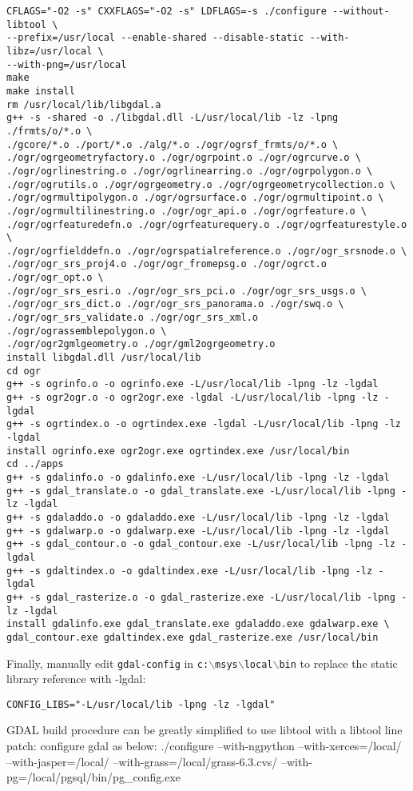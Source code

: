 \begin{verbatim}
CFLAGS="-O2 -s" CXXFLAGS="-O2 -s" LDFLAGS=-s ./configure --without-libtool \
--prefix=/usr/local --enable-shared --disable-static --with-libz=/usr/local \
--with-png=/usr/local
make
make install
rm /usr/local/lib/libgdal.a
g++ -s -shared -o ./libgdal.dll -L/usr/local/lib -lz -lpng ./frmts/o/*.o \
./gcore/*.o ./port/*.o ./alg/*.o ./ogr/ogrsf_frmts/o/*.o \
./ogr/ogrgeometryfactory.o ./ogr/ogrpoint.o ./ogr/ogrcurve.o \
./ogr/ogrlinestring.o ./ogr/ogrlinearring.o ./ogr/ogrpolygon.o \
./ogr/ogrutils.o ./ogr/ogrgeometry.o ./ogr/ogrgeometrycollection.o \
./ogr/ogrmultipolygon.o ./ogr/ogrsurface.o ./ogr/ogrmultipoint.o \
./ogr/ogrmultilinestring.o ./ogr/ogr_api.o ./ogr/ogrfeature.o \
./ogr/ogrfeaturedefn.o ./ogr/ogrfeaturequery.o ./ogr/ogrfeaturestyle.o \
./ogr/ogrfielddefn.o ./ogr/ogrspatialreference.o ./ogr/ogr_srsnode.o \
./ogr/ogr_srs_proj4.o ./ogr/ogr_fromepsg.o ./ogr/ogrct.o ./ogr/ogr_opt.o \
./ogr/ogr_srs_esri.o ./ogr/ogr_srs_pci.o ./ogr/ogr_srs_usgs.o \
./ogr/ogr_srs_dict.o ./ogr/ogr_srs_panorama.o ./ogr/swq.o \
./ogr/ogr_srs_validate.o ./ogr/ogr_srs_xml.o ./ogr/ograssemblepolygon.o \
./ogr/ogr2gmlgeometry.o ./ogr/gml2ogrgeometry.o
install libgdal.dll /usr/local/lib
cd ogr
g++ -s ogrinfo.o -o ogrinfo.exe -L/usr/local/lib -lpng -lz -lgdal
g++ -s ogr2ogr.o -o ogr2ogr.exe -lgdal -L/usr/local/lib -lpng -lz -lgdal
g++ -s ogrtindex.o -o ogrtindex.exe -lgdal -L/usr/local/lib -lpng -lz -lgdal
install ogrinfo.exe ogr2ogr.exe ogrtindex.exe /usr/local/bin
cd ../apps
g++ -s gdalinfo.o -o gdalinfo.exe -L/usr/local/lib -lpng -lz -lgdal
g++ -s gdal_translate.o -o gdal_translate.exe -L/usr/local/lib -lpng -lz -lgdal
g++ -s gdaladdo.o -o gdaladdo.exe -L/usr/local/lib -lpng -lz -lgdal
g++ -s gdalwarp.o -o gdalwarp.exe -L/usr/local/lib -lpng -lz -lgdal
g++ -s gdal_contour.o -o gdal_contour.exe -L/usr/local/lib -lpng -lz -lgdal
g++ -s gdaltindex.o -o gdaltindex.exe -L/usr/local/lib -lpng -lz -lgdal
g++ -s gdal_rasterize.o -o gdal_rasterize.exe -L/usr/local/lib -lpng -lz -lgdal
install gdalinfo.exe gdal_translate.exe gdaladdo.exe gdalwarp.exe \
gdal_contour.exe gdaltindex.exe gdal_rasterize.exe /usr/local/bin

\end{verbatim}

Finally, manually edit \texttt{gdal-config} in \texttt{c:$\backslash$msys$\backslash$local$\backslash$bin} to replace the static library reference with -lgdal:

\begin{verbatim}
CONFIG_LIBS="-L/usr/local/lib -lpng -lz -lgdal"
\end{verbatim}
GDAL build procedure can be greatly simplified to use libtool with a libtool line patch:
configure gdal as below:
./configure --with-ngpython --with-xerces=/local/ --with-jasper=/local/ --with-grass=/local/grass-6.3.cvs/ --with-pg=/local/pgsql/bin/pg\_config.exe 

